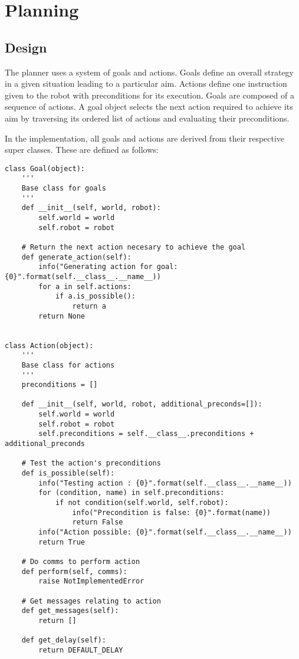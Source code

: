 \documentclass{article}
\begin{document}
\lstset{language=Python, showstringspaces=false}

\section{Planning}

\subsection{Design}

The planner uses a system of goals and actions. Goals define an overall strategy in a given situation leading to a particular aim. Actions define one instruction given to the robot with preconditions for its execution. Goals are composed of a sequence of actions. A goal object selects the next action required to achieve its aim by traversing its ordered list of actions and evaluating their preconditions.

In the implementation, all goals and actions are derived from their respective super classes. These are defined as follows:

\begin{lstlisting}
class Goal(object):
    '''
    Base class for goals
    '''
    def __init__(self, world, robot):
        self.world = world
        self.robot = robot

    # Return the next action necesary to achieve the goal
    def generate_action(self):
        info("Generating action for goal: {0}".format(self.__class__.__name__))
        for a in self.actions:
            if a.is_possible():
                return a
        return None


class Action(object):
    '''
    Base class for actions
    '''
    preconditions = []

    def __init__(self, world, robot, additional_preconds=[]):
        self.world = world
        self.robot = robot
        self.preconditions = self.__class__.preconditions + additional_preconds

    # Test the action's preconditions
    def is_possible(self):
        info("Testing action : {0}".format(self.__class__.__name__))
        for (condition, name) in self.preconditions:
            if not condition(self.world, self.robot):
                info("Precondition is false: {0}".format(name))
                return False
        info("Action possible: {0}".format(self.__class__.__name__))
        return True

    # Do comms to perform action
    def perform(self, comms):
        raise NotImplementedError

    # Get messages relating to action
    def get_messages(self):
        return []

    def get_delay(self):
        return DEFAULT_DELAY

\end{lstlisting}
\end{document}
